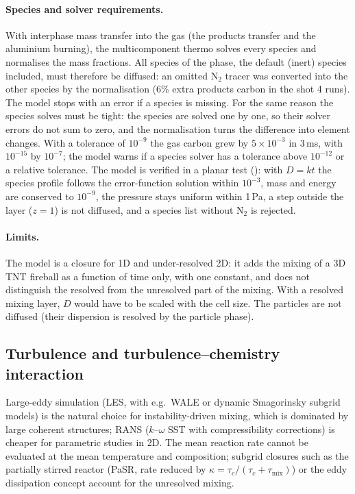 \documentclass{article}
\begin{document}
\paragraph{Species and solver requirements.} With interphase mass transfer into the gas (the products transfer and the aluminium burning), the multicomponent thermo solves every species and normalises the mass fractions. All species of the phase, the default (inert) species included, must therefore be diffused: an omitted N$_2$ tracer was converted into the other species by the normalisation (6\% extra products carbon in the shot 4 runs). The model stops with an error if a species is missing. For the same reason the species solves must be tight: the species are solved one by one, so their solver errors do not sum to zero, and the normalisation turns the difference into element changes. With a tolerance of $10^{-9}$ the gas carbon grew by $5\times10^{-3}$ in 3\,ms, with $10^{-15}$ by $10^{-7}$; the model warns if a species solver has a tolerance above $10^{-12}$ or a relative tolerance. The model is verified in a planar test (): with $D = kt$ the species profile follows the error-function solution within $10^{-3}$, mass and energy are conserved to $10^{-9}$, the pressure stays uniform within 1\,Pa, a step outside the layer ($z = 1$) is not diffused, and a species list without N$_2$ is rejected.

\paragraph{Limits.} The model is a closure for 1D and under-resolved 2D: it adds the mixing of a 3D TNT fireball as a function of time only, with one constant, and does not distinguish the resolved from the unresolved part of the mixing. With a resolved mixing layer, $D$ would have to be scaled with the cell size. The particles are not diffused (their dispersion is resolved by the particle phase).

\subsection{Turbulence and turbulence--chemistry interaction}

Large-eddy simulation (LES, with e.g.\ WALE or dynamic Smagorinsky subgrid models) is the natural choice for instability-driven mixing, which is dominated by large coherent structures; RANS ($k$--$\omega$ SST with compressibility corrections) is cheaper for parametric studies in 2D. The mean reaction rate cannot be evaluated at the mean temperature and composition; subgrid closures such as the partially stirred reactor (PaSR, rate reduced by $\kappa = \tau_c/(\tau_c + \tau_\text{mix})$) or the eddy dissipation concept account for the unresolved mixing.
\end{document}
